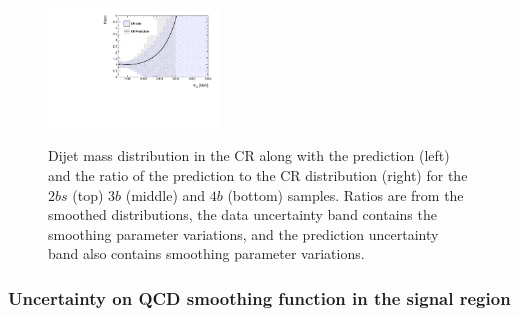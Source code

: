 \begin{figure}[htbp!]
\begin{center}
\includegraphics[width=0.4\textwidth,angle=-90]{figures/boosted/Syst_Shape/QCDSysfitSmooth_ratio_44.pdf} \\
\caption{Dijet mass distribution in the CR along with the prediction (left) and the ratio of the prediction to the CR distribution (right)  for the $2bs$ (top) $3b$ (middle) and $4b$ (bottom) samples.  Ratios are from the smoothed distributions, the data uncertainty band contains the smoothing parameter variations, and the prediction uncertainty band also contains smoothing parameter variations.}
\label{fig:qcd_shape_fit}
\end{center}
\end{figure}



\clearpage
\subsubsection{Uncertainty on QCD smoothing function in the signal region}
\label{unc-smooth-qcd-in-sr}

